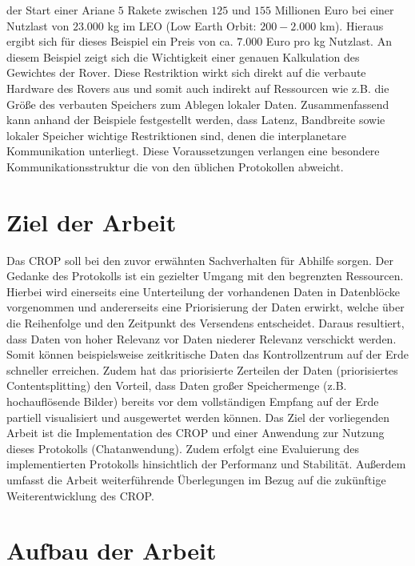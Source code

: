 der Start einer Ariane $5$ Rakete zwischen $125$ und $155$ Millionen Euro bei 
einer Nutzlast von $23.000$ kg im LEO (Low Earth Orbit: $200-2.000$ km).
Hieraus ergibt sich f{\"u}r dieses Beispiel ein Preis von ca. $7.000$ Euro pro kg 
Nutzlast. An diesem Beispiel zeigt sich die Wichtigkeit einer genauen
Kalkulation des Gewichtes der Rover. Diese Restriktion wirkt sich direkt auf die
verbaute Hardware des Rovers aus und somit auch indirekt auf Ressourcen wie z.B.
die Gr{\"o}{\ss}e des verbauten Speichers zum Ablegen lokaler Daten.\newline
Zusammenfassend kann anhand der Beispiele festgestellt werden, dass Latenz, 
Bandbreite sowie lokaler Speicher wichtige Restriktionen sind, denen die 
interplanetare Kommunikation unterliegt. Diese Voraussetzungen verlangen 
eine besondere Kommunikationsstruktur die von den {\"u}blichen Protokollen 
abweicht. 

\section{Ziel der Arbeit}

Das \gls{CROP} soll bei den zuvor erw{\"a}hnten Sachverhalten f{\"u}r Abhilfe
sorgen. Der Gedanke des Protokolls ist ein gezielter Umgang mit den begrenzten 
Ressourcen. Hierbei wird einerseits eine Unterteilung der vorhandenen 
Daten in Datenbl{\"o}cke vorgenommen und andererseits eine Priorisierung der 
Daten erwirkt, welche {\"u}ber die Reihenfolge und den Zeitpunkt des 
Versendens entscheidet. Daraus resultiert, dass Daten von hoher Relevanz 
vor Daten niederer Relevanz verschickt werden. Somit k{\"o}nnen 
beispielsweise zeitkritische Daten das Kontrollzentrum auf der Erde 
schneller erreichen. Zudem hat das priorisierte Zerteilen der Daten
(priorisiertes Contentsplitting) den Vorteil, dass Daten gro{\ss}er
Speichermenge (z.B.
hochaufl{\"o}sende Bilder) bereits vor dem vollst{\"a}ndigen Empfang auf der
Erde partiell visualisiert und ausgewertet werden k{\"o}nnen. Das Ziel der
vorliegenden Arbeit ist die Implementation des \gls{CROP} und einer Anwendung
zur Nutzung dieses Protokolls (Chatanwendung). Zudem erfolgt eine Evaluierung
des implementierten Protokolls hinsichtlich der Performanz und Stabilit{\"a}t.
Au{\ss}erdem umfasst die Arbeit weiterf{\"u}hrende {\"U}berlegungen im Bezug auf
die zuk{\"u}nftige Weiterentwicklung des \gls{CROP}.

\section{Aufbau der Arbeit}

